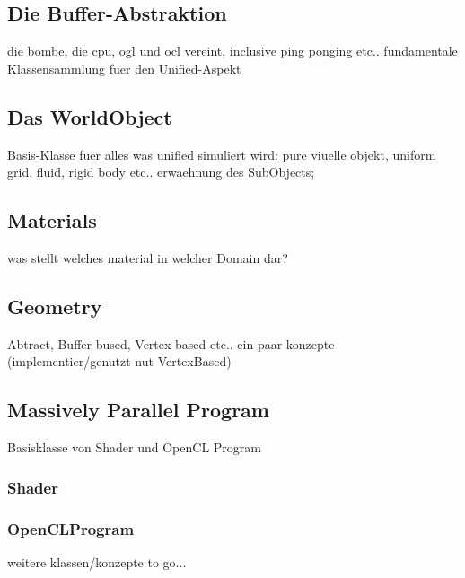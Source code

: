     	
\subsection{Die Buffer-Abstraktion}   	
 	die bombe, die cpu, ogl und ocl vereint, inclusive ping ponging etc.. fundamentale Klassensammlung fuer den Unified-Aspekt
 
\subsection{Das WorldObject}
	Basis-Klasse fuer alles was unified simuliert wird: pure viuelle objekt, uniform grid, fluid, rigid body etc..
	erwaehnung des SubObjects;  
 
\subsection{Materials}  
	was stellt welches material in welcher Domain dar?
	
\subsection{Geometry}
	Abtract, Buffer bused, Vertex based etc.. ein paar konzepte (implementier/genutzt nut VertexBased)  
	
\subsection{Massively Parallel Program}
	Basisklasse von Shader und OpenCL Program
	\subsubsection{Shader}
		
	\subsubsection{OpenCLProgram}

weitere klassen/konzepte to go...	
	  	
  	

\clearpage